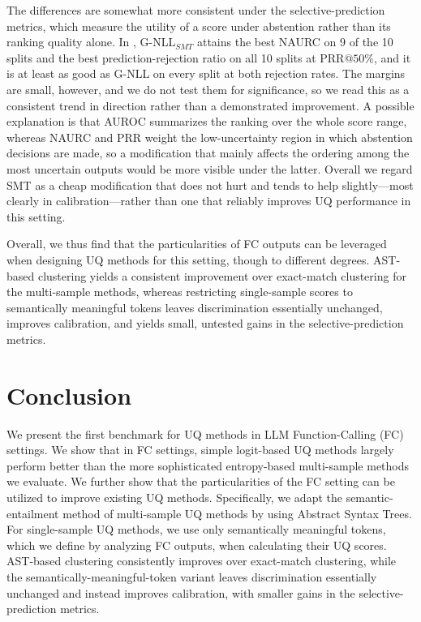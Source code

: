 The differences are somewhat more consistent under the selective-prediction metrics, which measure the utility of a score under abstention rather than its ranking quality alone. In , G-NLL$_{SMT}$ attains the best NAURC on 9 of the 10 splits and the best prediction-rejection ratio on all 10 splits at PRR$@50\%$, and it is at least as good as G-NLL on every split at both rejection rates. The margins are small, however, and we do not test them for significance, so we read this as a consistent trend in direction rather than a demonstrated improvement. A possible explanation is that AUROC summarizes the ranking over the whole score range, whereas NAURC and PRR weight the low-uncertainty region in which abstention decisions are made, so a modification that mainly affects the ordering among the most uncertain outputs would be more visible under the latter. Overall we regard SMT as a cheap modification that does not hurt and tends to help slightly---most clearly in calibration---rather than one that reliably improves UQ performance in this setting.

Overall, we thus find that the particularities of FC outputs can be leveraged when designing UQ methods for this setting, though to different degrees. AST-based clustering yields a consistent improvement over exact-match clustering for the multi-sample methods, whereas restricting single-sample scores to semantically meaningful tokens leaves discrimination essentially unchanged, improves calibration, and yields small, untested gains in the selective-prediction metrics.






\section{Conclusion}
We present the first benchmark for UQ methods in LLM Function-Calling (FC) settings. %
We show that in FC settings, simple logit-based UQ methods largely perform better than the more sophisticated entropy-based multi-sample methods we evaluate. %
We further show that the particularities of the FC setting can be utilized to improve existing UQ methods. Specifically, we adapt the semantic-entailment method of multi-sample UQ methods by using Abstract Syntax Trees. For single-sample UQ methods, we use only semantically meaningful tokens, which we define by analyzing FC outputs, when calculating their UQ scores. AST-based clustering consistently improves over exact-match clustering, while the semantically-meaningful-token variant leaves discrimination essentially unchanged and instead improves calibration, with smaller gains in the selective-prediction metrics. %




